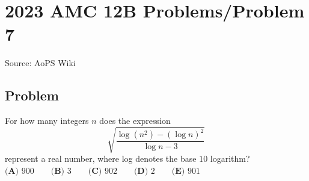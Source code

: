 \documentclass[12pt]{article}
\begin{document}
\section*{{2023 AMC 12B Problems/Problem 7}}
Source: AoPS Wiki

\subsection*{Problem}
For how many integers $n$ does the expression \[\sqrt{\frac{\log (n^2) - (\log n)^2}{\log n - 3}}\] represent a real number, where log denotes the base $10$ logarithm? $\textbf{(A) }900 \qquad \textbf{(B) }3\qquad \textbf{(C) }902 \qquad \textbf{(D) } 2 \qquad \textbf{(E) }901$
\end{document}

